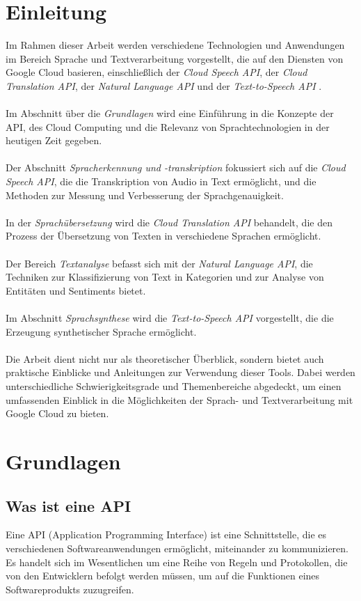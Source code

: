 \documentclass[12pt,a4paper]{article}
\begin{document}
\section*{Einleitung}
Im Rahmen dieser Arbeit werden verschiedene Technologien und Anwendungen im Bereich Sprache und Textverarbeitung vorgestellt, die auf den Diensten von Google Cloud basieren, einschließlich der \textit{Cloud Speech API}, der \textit{Cloud Translation API}, der \textit{Natural Language API} und der \textit{Text-to-Speech API} \cite{google}.
\\ \\
Im Abschnitt über die \textit{Grundlagen} wird eine Einführung in die Konzepte der API, des Cloud Computing und die Relevanz von Sprachtechnologien in der heutigen Zeit gegeben.
\\ \\
Der Abschnitt \textit{Spracherkennung und -transkription} fokussiert sich auf die \textit{Cloud Speech API}, die die Transkription von Audio in Text ermöglicht, und die Methoden zur Messung und Verbesserung der Sprachgenauigkeit.
\\ \\
In der \textit{Sprachübersetzung} wird die \textit{Cloud Translation API} behandelt, die den Prozess der Übersetzung von Texten in verschiedene Sprachen ermöglicht.
\\ \\
Der Bereich \textit{Textanalyse} befasst sich mit der \textit{Natural Language API}, die Techniken zur Klassifizierung von Text in Kategorien und zur Analyse von Entitäten und Sentiments bietet.
\\ \\
Im Abschnitt \textit{Sprachsynthese} wird die \textit{Text-to-Speech API} vorgestellt, die die Erzeugung synthetischer Sprache ermöglicht.
\\ \\
Die Arbeit dient nicht nur als theoretischer Überblick, sondern bietet auch praktische Einblicke und Anleitungen zur Verwendung dieser Tools. Dabei werden unterschiedliche Schwierigkeitsgrade und Themenbereiche abgedeckt, um einen umfassenden Einblick in die Möglichkeiten der Sprach- und Textverarbeitung mit Google Cloud zu bieten.

	
\newpage

\section{Grundlagen}
\subsection{Was ist eine API}
Eine API (Application Programming Interface) ist eine Schnittstelle, die es verschiedenen Softwareanwendungen ermöglicht, miteinander zu kommunizieren. Es handelt sich im Wesentlichen um eine Reihe von Regeln und Protokollen, die von den Entwicklern befolgt werden müssen, um auf die Funktionen eines Softwareprodukts zuzugreifen.
\end{document}
